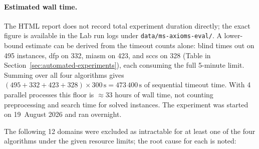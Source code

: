 \documentclass[11pt,a4paper]{article}
\begin{document}
\paragraph{Estimated wall time.}
The HTML report does not record total experiment duration directly; the exact
figure is available in the Lab run logs under
\texttt{data/ms-axioms-eval/}.
A lower-bound estimate can be derived from the timeout counts alone:
blind times out on 495 instances, dfp on 332, miasm on 423, and sccs on 328
(Table in Section~\ref{sec:automated-experiments}), each consuming the full
5-minute limit.  Summing over all four algorithms gives
$(495 + 332 + 423 + 328) \times 300\,\mathrm{s} = 473\,400\,\mathrm{s}$
of sequential timeout time.  With 4 parallel processes this floor is
$\approx 33$ hours of wall time, not counting preprocessing and search time
for solved instances.  The experiment was started on 19~August 2026 and ran
overnight.

The following 12 domains were excluded as intractable for at least one
of the four algorithms under the given resource limits; the root cause for
each is noted:
\end{document}
